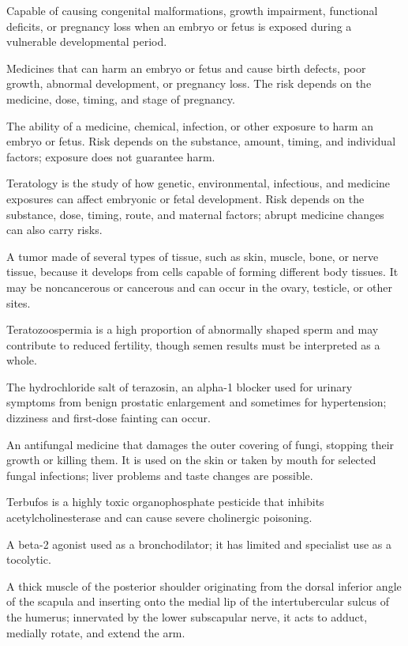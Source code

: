  Capable of causing congenital malformations, growth impairment, functional deficits, or pregnancy loss when an embryo or fetus is exposed during a vulnerable developmental period.

 Medicines that can harm an embryo or fetus and cause birth defects, poor growth, abnormal development, or pregnancy loss. The risk depends on the medicine, dose, timing, and stage of pregnancy.

 The ability of a medicine, chemical, infection, or other exposure to harm an embryo or fetus. Risk depends on the substance, amount, timing, and individual factors; exposure does not guarantee harm.

 Teratology is the study of how genetic, environmental, infectious, and medicine exposures can affect embryonic or fetal development. Risk depends on the substance, dose, timing, route, and maternal factors; abrupt medicine changes can also carry risks.

 A tumor made of several types of tissue, such as skin, muscle, bone, or nerve tissue, because it develops from cells capable of forming different body tissues. It may be noncancerous or cancerous and can occur in the ovary, testicle, or other sites.

 Teratozoospermia is a high proportion of abnormally shaped sperm and may contribute to reduced fertility, though semen results must be interpreted as a whole.

 The hydrochloride salt of terazosin, an alpha-1 blocker used for urinary symptoms from benign prostatic enlargement and sometimes for hypertension; dizziness and first-dose fainting can occur.

 An antifungal medicine that damages the outer covering of fungi, stopping their growth or killing them. It is used on the skin or taken by mouth for selected fungal infections; liver problems and taste changes are possible.

 Terbufos is a highly toxic organophosphate pesticide that inhibits acetylcholinesterase and can cause severe cholinergic poisoning.

 A beta-2 agonist used as a bronchodilator; it has limited and specialist use as a tocolytic.

 A thick muscle of the posterior shoulder originating from the dorsal inferior angle of the scapula and inserting onto the medial lip of the intertubercular sulcus of the humerus; innervated by the lower subscapular nerve, it acts to adduct, medially rotate, and extend the arm.

